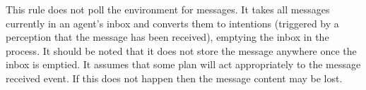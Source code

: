 This rule does not poll the environment for
messages.  It takes all
messages currently in an agent's inbox and converts them
to intentions (triggered by a perception that the message has been
received), emptying the inbox in the process.  It should be noted that
it does not store the message anywhere once the inbox is emptied.  It
assumes that some plan will act appropriately to the message received
event.  If this does not happen then the message content may be
lost. 



